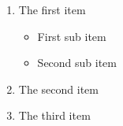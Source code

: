 \begin{enumerate}
 \item The first item
 \begin{itemize}
  \item First sub item
  \item Second sub item
 \end{itemize}
 \item The second item
 \item The third item
\end{enumerate}
